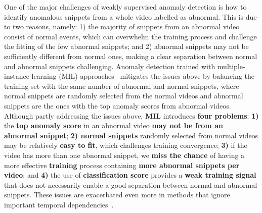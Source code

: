 \documentclass[final]{cvpr}
\begin{document}
One of the major challenges of weakly supervised anomaly detection is how to identify anomalous snippets from a whole video labelled as abnormal. 
This is due to two reasons, namely: 1) the majority of snippets from an abnormal video consist of normal events, which can overwhelm the training process and challenge the fitting of the few abnormal snippets; and 2) abnormal snippets may not be sufficiently different from normal ones, making a clear separation between normal and abnormal snippets challenging.
Anomaly detection trained with multiple-instance learning (MIL) approaches~\cite{sultani2018real,Wu2020not,zhu2019motion,8803657} mitigates the issues above by balancing the training set with the same number of abnormal and normal snippets, where normal snippets are randomly selected from the normal videos and abnormal snippets are the ones with the top anomaly scores from abnormal videos. Although partly addressing the issues above, \textbf{MIL} introduces \textbf{four problems}: \textbf{1)} the \textbf{top anomaly score} in an abnormal video \textbf{may not be from an abnormal snippet}; \textbf{2) normal snippets} randomly selected from normal videos may be relatively \textbf{easy to fit}, which challenges training convergence; \textbf{3)} if the video has more than one abnormal snippet, we \textbf{miss the chance} of having a more effective \textbf{training} process containing \textbf{more abnormal snippets per video}; and \textbf{4)} the use of \textbf{classification score} provides a \textbf{weak training signal} that does not necessarily enable a good separation between normal and abnormal snippets.
These issues are exacerbated even more in methods that ignore important temporal dependencies~\cite{zhong2019graph,liu2018future,Wu2020not,luo2017revisit}. 
\end{document}
